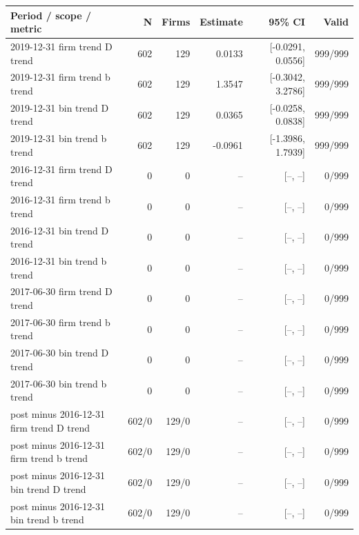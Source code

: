 \begingroup\scriptsize\setlength{\tabcolsep}{3pt}
\begin{threeparttable}
\begin{tabular}{p{6.0cm}rrrrr}
\toprule
Period / scope / metric & N & Firms & Estimate & 95\% CI & Valid \\
\midrule
2019-12-31 firm trend D trend & 602 & 129 & 0.0133 & [-0.0291, 0.0556] & 999/999 \\
2019-12-31 firm trend b trend & 602 & 129 & 1.3547 & [-0.3042, 3.2786] & 999/999 \\
2019-12-31 bin trend D trend & 602 & 129 & 0.0365 & [-0.0258, 0.0838] & 999/999 \\
2019-12-31 bin trend b trend & 602 & 129 & -0.0961 & [-1.3986, 1.7939] & 999/999 \\
2016-12-31 firm trend D trend & 0 & 0 & -- & [--, --] & 0/999 \\
2016-12-31 firm trend b trend & 0 & 0 & -- & [--, --] & 0/999 \\
2016-12-31 bin trend D trend & 0 & 0 & -- & [--, --] & 0/999 \\
2016-12-31 bin trend b trend & 0 & 0 & -- & [--, --] & 0/999 \\
2017-06-30 firm trend D trend & 0 & 0 & -- & [--, --] & 0/999 \\
2017-06-30 firm trend b trend & 0 & 0 & -- & [--, --] & 0/999 \\
2017-06-30 bin trend D trend & 0 & 0 & -- & [--, --] & 0/999 \\
2017-06-30 bin trend b trend & 0 & 0 & -- & [--, --] & 0/999 \\
post minus 2016-12-31 firm trend D trend & 602/0 & 129/0 & -- & [--, --] & 0/999 \\
post minus 2016-12-31 firm trend b trend & 602/0 & 129/0 & -- & [--, --] & 0/999 \\
post minus 2016-12-31 bin trend D trend & 602/0 & 129/0 & -- & [--, --] & 0/999 \\
post minus 2016-12-31 bin trend b trend & 602/0 & 129/0 & -- & [--, --] & 0/999 \\
\bottomrule
\end{tabular}
\begin{tablenotes}[flushleft]\footnotesize

\end{tablenotes}
\end{threeparttable}
